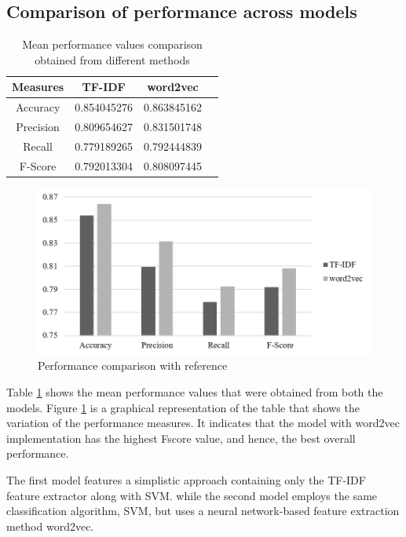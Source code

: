\documentclass[fleqn --11pt --twoside]{IOEGC2016} %
\begin{document}
\subsection{Comparison of performance across models}
\begin{table}[!ht]
\centering
    \caption{Mean performance values comparison obtained from different methods}
    \begin{tabular}{|c|c|c|c|}
        \hline
        Measures & TF-IDF & word2vec \\ \hline
        Accuracy & 0.854045276 & 0.863845162 \\ \hline
        Precision & 0.809654627 & 0.831501748 \\ \hline
        Recall & 0.779189265 & 0.792444839 \\ \hline
        F-Score & 0.792013304 & 0.808097445 \\ \hline
    \end{tabular}
    \label{tab:performance}
\end{table}
\begin{figure}[!ht]
\centering
\includegraphics[width=\linewidth]{assets/comparison_nvo}
\caption{Performance comparison with reference}
\label{fig:comparison_nvo}
\end{figure}
Table \ref{tab:performance} shows the mean performance values that were obtained from both the models. Figure \ref{fig:comparison_nvo} is a graphical representation of the table that shows the variation of the performance measures. It indicates that the model with word2vec implementation has the highest Fscore value, and hence, the best overall performance.
\par The first model features a simplistic approach containing only the TF-IDF feature extractor along with SVM. while the second model employs the same classification algorithm, SVM, but uses a neural network-based feature extraction method word2vec. 
\end{document}
